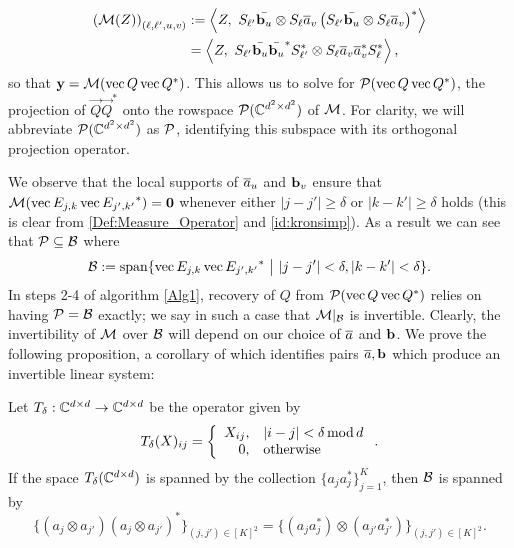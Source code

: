 \begin{equation}
  \begin{aligned}
\left(\mathcal{M}(Z) \right)_{(\ell,\ell',u,v)} &:= \left\langle  Z, ~S_{\ell'} \bar{\b_u} \otimes S_{\ell} \a_v \left(S_{\ell'} \bar{\b_u} \otimes S_{\ell} \a_v\right)^*\right\rangle \\ &= \left\langle Z, ~S_{\ell'} \bar{\b_u}\bar{\b_u}^* S^*_{\ell'} \otimes S_\ell \a_v \a_v^* S^*_\ell \right\rangle,
  \end{aligned}
\label{Def:Measure_Operator}
\end{equation}
so that $\y = \mathcal{M}(\vec{Q} \vec{Q}^*)$.  This allows us to solve for $\Pc(\vec{Q} \vec{Q}^*)$, the projection of $\vec{Q} \vec{Q}^*$ onto the rowspace $\Pc(\C^{d^2 \times d^2})$ of $\Mc$.  For clarity, we will abbreviate $\Pc(\C^{d^2 \times d^2})$ as $\Pc$, identifying this subspace with its orthogonal projection operator.

We observe that the local supports of $\a_u$ and $\b_v$ ensure that $\mathcal{M}( \vec{E_{j,k}} \vec{E_{j',k'}}^*) = {\bf 0}$ whenever either $|j - j'| \geq \delta$ or $|k - k'| \geq \delta$ holds (this is clear from \eqref{Def:Measure_Operator} and \eqref{id:kronsimp}).  As a result we can see that $\Pc \subset \B$ where \begin{equation} \B := \Span\{ \vec{E_{j,k}} \vec{E_{j',k'}}^* ~{\bf \big |}~  |j - j'| < \delta, |k - k'| < \delta \}. \label{eq:defB} \end{equation}  %
In steps 2-4 of algorithm \ref{Alg1}, recovery of $Q$ from $\Pc(\vec{Q} \vec{Q}^*)$ relies on having $\Pc = \B$ exactly; we say in such a case that $\Mc|_\B$ is invertible.  Clearly, the invertibility of $\Mc$ over $\B$ will depend on our choice of $\a$ and $\b$.  We prove the following proposition, a corollary of which identifies pairs $\a, \b$ which produce an invertible linear system:
\begin{proposition}
  Let $T_\delta : \C^{d \times d} \to \C^{d \times d}$ be the operator given by \[T_\delta(X)_{ij} = \left\{\begin{array}{r@{,\quad}l}
  X_{ij} & |i - j| < \delta \mod d \\
  0 & \text{otherwise}\end{array}\right..\]
  If the space $T_{\delta}(\C^{d \times d})$ is spanned by the collection $\{a_j a_j^*\}_{j=1}^K$, then $\B$ is spanned by \[\{(a_j \otimes a_{j'}) (a_j \otimes a_{j'})^*\}_{(j, j') \in [K]^2} = \{(a_j a_j^*) \otimes (a_{j'} a_{j'}^*)\}_{(j, j') \in [K]^2}.\]
  \label{prop:kronspan}
\end{proposition}

